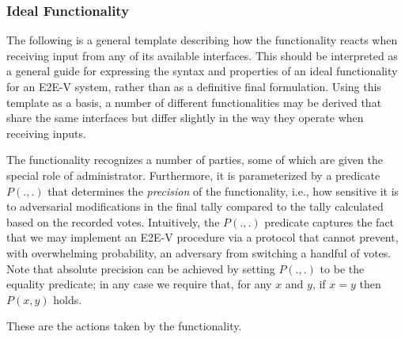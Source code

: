 \subsubsection{Ideal Functionality}

The following is a general template describing how the functionality
reacts when receiving input from any of its available interfaces. This
should be interpreted as a general guide for expressing the syntax and
properties of an ideal functionality for an E2E-V system, rather than
as a definitive final formulation. Using this template as a basis, a
number of different functionalities may be derived that share the same
interfaces but differ slightly in the way they operate when receiving
inputs.

The functionality recognizes a number of parties, some of which are
given the special role of administrator. Furthermore, it is
parameterized by a predicate $P(.,.)$ that determines the
\emph{precision} of the functionality, i.e., how sensitive it is to
adversarial modifications in the final tally compared to the tally
calculated based on the recorded votes. Intuitively, the $P(.,.)$
predicate captures the fact that we may implement an E2E-V procedure
via a protocol that cannot prevent, with overwhelming probability, an
adversary from switching a handful of votes. Note that absolute
precision can be achieved by setting $P(.,.)$ to be the equality
predicate; in any case we require that, for any $x$ and $y$, if $x=y$
then $P(x,y)$ holds.

These are the actions taken by the functionality.

